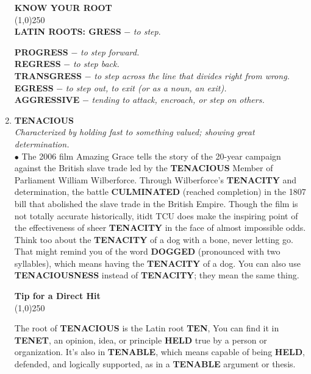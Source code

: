 \documentclass{book}
\begin{document}
\begin{enumerate}
\begin{tcolorbox}
\begin{center}
\textbf{ KNOW YOUR ROOT}\\
\line(1,0){250}\\
\textbf{LATIN ROOTS: GRESS} $ - $ \textit{to step}.\\  
\end{center}  
\textbf{PROGRESS} $ - $ \textit{to step forward.}\\
\textbf{REGRESS} $ - $ \textit{to step back.}\\
\textbf{TRANSGRESS} $ - $ \textit{ to step across the line that divides right from wrong.}\\
\textbf{EGRESS} $ - $ \textit{to step out, to exit (or as a noun, an exit).}\\
\textbf{AGGRESSIVE} $ - $ \textit{tending to attack, encroach, or step on others.}
\end{tcolorbox}

\item \textbf{TENACIOUS}\\
\textit{Characterized by holding fast to something valued; showing great determination.}\\

$\bullet$ The 2006 film Amazing Grace tells the story of the 20-year campaign against the British slave trade led by the \textbf{TENACIOUS} Member of Parliament William Wilberforce. Through Wilberforce's \textbf{TENACITY} and determination, the battle \textbf{CULMINATED} (reached completion) in the 1807 bill that abolished the slave trade in the British Empire. Though the film is not totally accurate historically, itidt TCU does make the inspiring point of the effectiveness of sheer \textbf{TENACITY} in the face of almost impossible odds.\\

Think too about the \textbf{TENACITY} of a dog with a bone, never letting go. That might remind you of the word \textbf{DOGGED} (pronounced with two syllables), which means having the \textbf{TENACITY} of a dog. You can also use \textbf{TENACIOUSNESS} instead of \textbf{TENACITY}; they mean the same thing.
\begin{tcolorbox}
\begin{center}
\textbf{Tip for a Direct Hit}\\
\line(1,0){250}\\
\end{center}  
The root of \textbf{TENACIOUS} is the Latin root \textbf{TEN},  You can find it in \textbf{TENET}, an opinion, idea, or principle \textbf{HELD} true by a person or organization. It's also in \textbf{TENABLE}, which means capable of being \textbf{HELD}, defended, and logically supported, as in a \textbf{TENABLE} argument or thesis.
\end{tcolorbox}


\end{enumerate}
\end{document}
